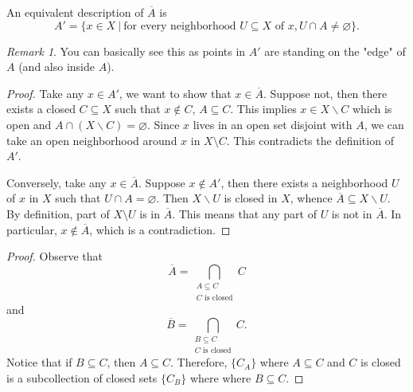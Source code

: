 \documentclass[article,11pt, reqno]{article}
\newtheorem*{lemma}{Lemma}
\theoremstyle{remark}
\newtheorem*{remark}{Remark}
\newcommand{\<}{\langle}
\renewcommand{\>}{\rangle}
\begin{document}
An equivalent description of $\overline A$ is
$$A'=\{x\in X\ | \ \text{for every neighborhood } U\subseteq X \text{ of } x, U\cap A\neq \varnothing\}.$$
\begin{remark}
    You can basically see this as points in $A'$ are standing on the "edge" of $A$ (and also inside $A$).
\end{remark}
\noindent
{}
\begin{proof}
    Take any $x\in A'$, we want to show that $x\in\overline A$. Suppose not, then there exists a closed $C\subseteq X$ such that $x\notin C$, $A\subseteq C$. This implies $x\in X\backslash C$ which is open and $A\cap (X\backslash C)=\varnothing$. Since $x$ lives in an open set disjoint with $A$, we can take an open neighborhood around $x$ in $X\setminus C$. This contradicts the definition of $A'$.

    Conversely, take any $x\in\overline A$. Suppose $x\notin A'$, then there exists a neighborhood $U$ of $x$ in $X$ such that $U\cap A=\varnothing$. Then $X\backslash U$ is closed in $X$, whence $\overline A\subseteq X\backslash U$. By definition, part of $X\setminus U$ is in $\overline A$. This means that any part of $U$ is not in $\overline A$. In particular, $x\notin \overline A$, which is a contradiction.
\end{proof}
\noindent
{}
\begin{proof}
    Observe that $$\overline A = \bigcap_{\substack{A\subseteq C\\ C \text{  is closed}}} C$$ and $$\overline B = \bigcap_{\substack{B\subseteq C\\ C \text{ is closed}}} C.$$
    Notice that if $B\subseteq C$, then $A\subseteq C$. Therefore, $\{C_A\}$ where $A\subseteq C$ and $C$ is closed is a subcollection of closed sets $\{C_B\}$ where where $B\subseteq C$.
\end{proof}
\noindent
{}
\end{document}

